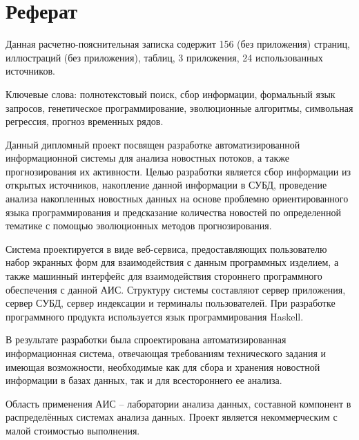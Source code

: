 \section*{Реферат}
Данная расчетно-пояснительная записка содержит 156 (без приложения) страниц,  иллюстраций (без приложения),  таблиц, 3 приложения, 24 использованных источников.

Ключевые слова: полнотекстовый поиск, сбор информации, формальный язык запросов, генетическое программирование, эволюционные алгоритмы, символьная регрессия, прогноз временных рядов.

Данный дипломный проект посвящен разработке автоматизированной информационной системы для анализа новостных потоков, а также прогнозирования их активности. Целью разработки является сбор информации из открытых источников, накопление данной информации в СУБД, проведение анализа накопленных новостных данных на основе проблемно ориентированного языка программирования и предсказание количества новостей по определенной тематике с помощью эволюционных методов прогнозирования.

Система проектируется в виде веб-сервиса, предоставляющих пользователю набор экранных форм для взаимодействия с данным программных изделием, а также машинный интерфейс для взаимодействия стороннего программного обеспечения с данной АИС. Структуру системы составляют сервер приложения, сервер СУБД, сервер индексации и терминалы пользователей. При разработке программного продукта используется язык программирования Haskell.

В результате разработки была спроектирована автоматизированная информационная система, отвечающая требованиям технического задания и имеющая возможности, необходимые как для сбора и хранения новостной информации в базах данных, так и для всестороннего ее анализа.

Область применения АИС -- лаборатории анализа данных, составной компонент в распределённых системах анализа данных. Проект является некоммерческим с малой стоимостью выполнения.
